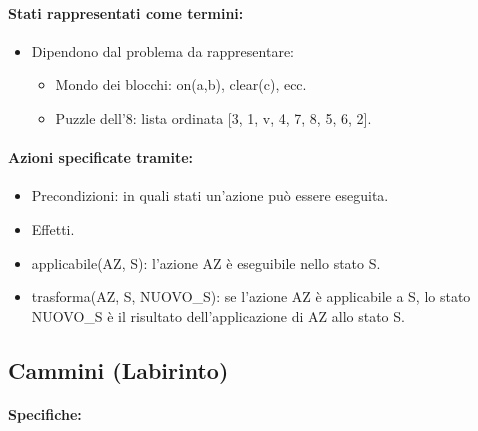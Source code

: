 




\paragraph{Stati rappresentati come termini:}

\begin{itemize}
  \item Dipendono dal problema da rappresentare: 
    \begin{itemize}
      \item Mondo dei blocchi: on(a,b), clear(c), ecc. 
      \item Puzzle dell'8: lista ordinata [3, 1, v, 4, 7, 8, 5, 6, 2].
    \end{itemize}
\end{itemize}

\paragraph{Azioni specificate tramite:}

\begin{itemize}
  \item Precondizioni: in quali stati un'azione può essere eseguita.
  \item Effetti.
  \item applicabile(AZ, S): l'azione AZ è eseguibile nello stato S. 
  \item trasforma(AZ, S, NUOVO\_S): se l'azione AZ è applicabile a S, lo stato NUOVO\_S è il risultato dell'applicazione di AZ allo stato S.
\end{itemize}

\subsection{Cammini (Labirinto)}

\paragraph{Specifiche:}

